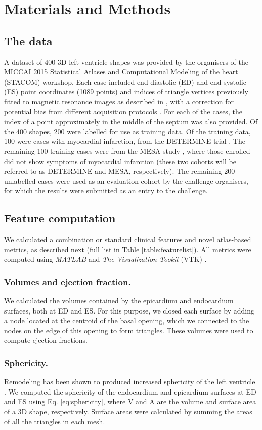 \documentclass{llncs}
\begin{document}
\section{Materials and Methods}
	\subsection{The data}
A dataset of 400 3D left ventricle shapes was provided by the organisers of the MICCAI 2015 Statistical Atlases and Computational Modeling of the heart (STACOM) workshop. Each case included end diastolic (ED) and end systolic (ES) point coordinates (1089 points) and indices of triangle vertices previously fitted to magnetic resonance images as described in \cite{Young2000}, with a correction for potential bias from different acquisition protocols \cite{Medrano-Gracia2013}. For each of the cases, the index of a point approximately in the middle of the septum was also provided. Of the 400 shapes, 200 were labelled for use as training data. Of the training data, 100 were cases with myocardial infarction, from the DETERMINE trial \cite{Kadish2009}. The remaining 100 training cases were from the MESA study \cite{Bild2002}, where those enrolled did not show symptoms of myocardial infarction (these two cohorts will be referred to as DETERMINE and MESA, respectively). The remaining 200 unlabelled cases were used as an evaluation cohort by the challenge organisers, for which the results were submitted as an entry to the challenge. 


	\subsection{Feature computation}
	We calculated a combination or standard clinical features and novel atlas-based metrics, as described next (full list in Table \ref{table:featurelist}). All metrics were computed using \emph{\mbox{MATLAB}} and \emph{The Visualization Tookit} (VTK) \cite{Schroeder2006}.
	\subsubsection{Volumes and ejection fraction.}
We calculated the volumes contained by the epicardium and endocardium surfaces, both at ED and ES. For this purpose, we closed each surface by adding a node located at the centroid of the basal opening, which we connected to the nodes on the edge of this opening to form triangles. These volumes were used to compute ejection fractions. 
\subsubsection{Sphericity.}Remodeling has been shown to produced increased sphericity of the left ventricle \cite{Sutton2000}. We  computed the sphericity \cite{Wadell1933} of the endocardium and epicardium surfaces at ED and ES using Eq. \ref{eq:sphericity}, where V and A are the volume and surface area of a 3D shape, respectively. Surface areas were calculated by summing the areas of all the triangles in each mesh.
\end{document}
